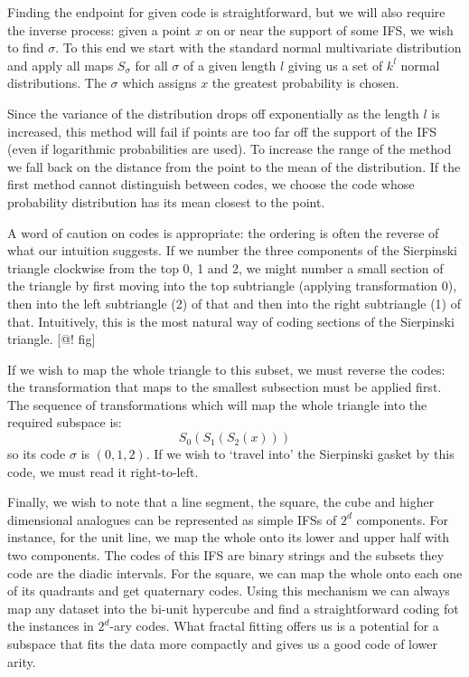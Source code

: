 \documentclass[11pt]{article}
\theoremstyle{definition}
\begin{document}
Finding the endpoint for given code is straightforward, but we will also require the inverse process: given a point $x$ on or near the support of some IFS, we wish to find $\sigma$. To this end we start with the standard normal multivariate distribution and apply all maps $S_\sigma$ for all $\sigma$ of a given length $l$ giving us a set of $k^l$ normal distributions. The $\sigma$ which assigns $x$ the greatest probability is chosen.

Since the variance of the distribution drops off exponentially as the length $l$ is increased, this method will fail if points are too far off the support of the IFS (even if logarithmic probabilities are used). To increase the range of the method we fall back on the distance from the point to the mean of the distribution. If the first method cannot distinguish between codes, we choose the code whose probability distribution has its mean closest to the point.

A word of caution on codes is appropriate: the ordering is often the reverse of what our intuition suggests. If we number the three components of the Sierpinski triangle clockwise from the top 0, 1 and 2, we might number a small section of the triangle by first moving into the top subtriangle (applying transformation 0), then into the left subtriangle (2) of that and then into the right subtriangle (1) of that. Intuitively, this is the most natural way of coding sections of the Sierpinski triangle. [@! fig]

If we wish to map the whole triangle to this subset, we must reverse the codes: the transformation that maps to the smallest subsection must be applied first. The sequence of transformations which will map the whole triangle into the required subspace is:
\[
S_0(S_1(S_2(x)))
\]
so its code $\sigma$ is $(0, 1, 2)$. If we wish to `travel into' the Sierpinski gasket by this code, we must read it right-to-left.

Finally, we wish to note that a line segment, the square, the cube and higher dimensional analogues can be represented as simple IFSs of $2^d$ components. For instance, for the unit line, we map the whole onto its lower and upper half with two components. The codes of this IFS are binary strings and the subsets they code are the diadic intervals. For the square, we can map the whole onto each one of its quadrants and get quaternary codes. Using this mechanism we can always map any dataset into the bi-unit hypercube and find a straightforward coding fot the instances in $2^d$-ary codes. What fractal fitting offers us is a potential for a subspace that fits the data more compactly and gives us a good code of lower arity.
\end{document}
